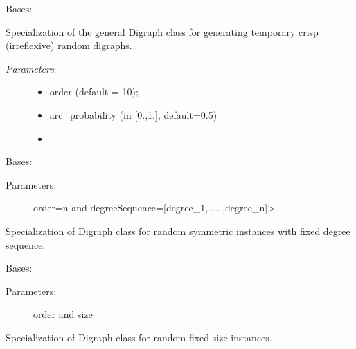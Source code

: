 \documentclass[letterpaper,10pt,english]{sphinxmanual}
\begin{document}

\begin{fulllineitems}
\label{techDoc:digraphs.RandomDigraph}
Bases: {\hyperref[techDoc:digraphs.Digraph]{}}

Specialization of the general Digraph class for generating
temporary crisp (irreflexive) random digraphs.
\begin{description}
\item[{\emph{Parameters}:}] \leavevmode\begin{itemize}
\item {} 
order (default = 10);

\item {} 
arc\_probability (in {[}0.,1.{]}, default=0.5)

\item {} 
\end{itemize}

\end{description}

\end{fulllineitems}


\begin{fulllineitems}
\label{techDoc:digraphs.RandomFixedDegreeSequenceDigraph}
Bases: {\hyperref[techDoc:digraphs.Digraph]{}}
\begin{description}
\item[{Parameters:}] \leavevmode
order=n and degreeSequence={[}degree\_1, ... ,degree\_n{]}\textgreater{}

\end{description}

Specialization of Digraph class for random symmetric instances
with fixed degree sequence.

\end{fulllineitems}


\begin{fulllineitems}
\label{techDoc:digraphs.RandomFixedSizeDigraph}
Bases: {\hyperref[techDoc:digraphs.Digraph]{}}
\begin{description}
\item[{Parameters:}] \leavevmode
order and size

\end{description}

Specialization of Digraph class for random fixed size instances.

\end{fulllineitems}
\end{document}

